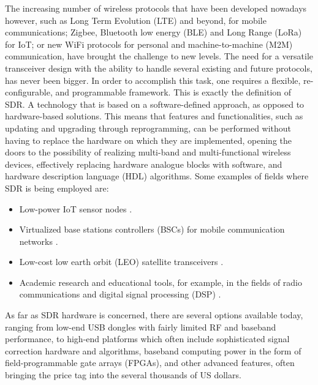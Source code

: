 The increasing number of wireless protocols that have been developed nowadays however, such as Long Term Evolution (LTE) and beyond, for mobile communications; Zigbee, Bluetooth low energy (BLE) and Long Range (LoRa) for IoT; or new WiFi protocols for personal and machine-to-machine (M2M) communication, have brought the challenge to new levels. The need for a versatile transceiver design with the ability to handle several existing and future protocols, has never been bigger. In order to accomplish this task, one requires a flexible, re-configurable, and programmable framework. This is exactly the definition of SDR. A technology that is based on a software-defined approach, as opposed to hardware-based solutions. This means that features and functionalities, such as updating and upgrading through reprogramming, can be performed without having to replace the hardware on which they are implemented, opening the doors to the possibility of realizing multi-band and multi-functional wireless devices, effectively replacing hardware analogue blocks with software, and hardware description language (HDL) algorithms. Some examples of fields where SDR is being employed are:
\begin{itemize}
  \item Low-power IoT sensor nodes \cite{sdr_sensors}.
  \item Virtualized base stations controllers (BSCs) for mobile communication networks \cite{aict17}.
  \item Low-cost low earth orbit (LEO) satellite transceivers \cite{icssc16}.
  \item Academic research and educational tools, for example, in the fields of radio communications and digital signal processing (DSP) \cite{sdr_teaching}.
\end{itemize}

As far as SDR hardware is concerned, there are several options available today, ranging from low-end USB dongles with fairly limited RF and baseband performance, to high-end platforms which often include sophisticated signal correction hardware and algorithms, baseband computing power in the form of field-programmable gate arrays (FPGAs), and other advanced features, often bringing the price tag into the several thousands of US dollars.

